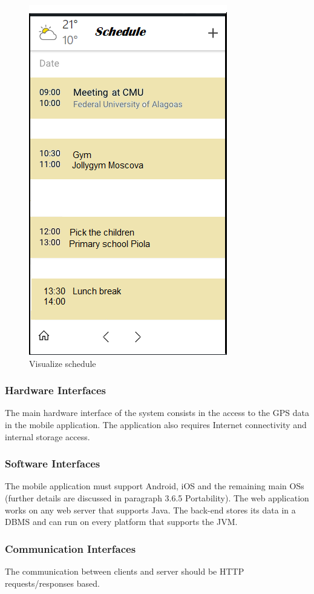 		\begin{figure}[H]
			\centerline{\includegraphics[scale=0.5]{Images/schedule}}
			\caption{Visualize schedule}
		\end{figure}
	
	\subsubsection{Hardware Interfaces}
	The main hardware interface of the system consists in the access to the GPS data
	in the mobile application. The application also requires Internet connectivity
	and internal storage access.
	
	\subsubsection{Software Interfaces}
	The mobile application must support Android, iOS and the remaining main OSs (further details are discussed in paragraph 3.6.5 Portability). The web application
	works on any web server that supports Java. The back-end stores its data in a
	DBMS and can run on every platform that supports the JVM.
	\subsubsection{Communication Interfaces}
	The communication between clients and server should be HTTP requests/responses based.
